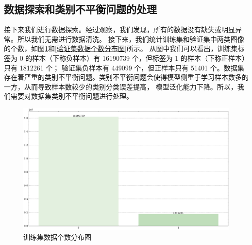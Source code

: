 \documentclass[supercite]{Experimental_Report}
\theoremstyle{definition}
\begin{document}
\subsection{数据探索和类别不平衡问题的处理}
接下来我们进行数据探索。经过观察，我们发现，所有的数据没有缺失或明显异常。所以我们无需进行数据清洗。
接下来，我们统计训练集和验证集中两类图像的个数，如图\ref{训练集数据个数分布图}和\ref{验证集数据个数分布图}所示。
从图中我们可以看出，训练集标签为 0 的样本（下称负样本）有 16190739 个，但标签为 1 的样本（下称正样本）只有 1812261 个；
验证集负样本有 449099 个，但正样本只有 51401 个。数据集存在着严重的类别不平衡问题。类别不平衡问题会使得模型侧重于学习样本数多的一方，从而导致样本数较少的类别分类误差提高，
模型泛化能力下降。所以，我们需要对数据集类别不平衡问题进行处理。
\begin{figure}[H]
	\begin{center}
		\includegraphics[scale=0.4]{../images/训练集数据个数分布图.pdf}
		\caption{训练集数据个数分布图}
		\label{训练集数据个数分布图}
	\end{center}
\end{figure}
\end{document}
